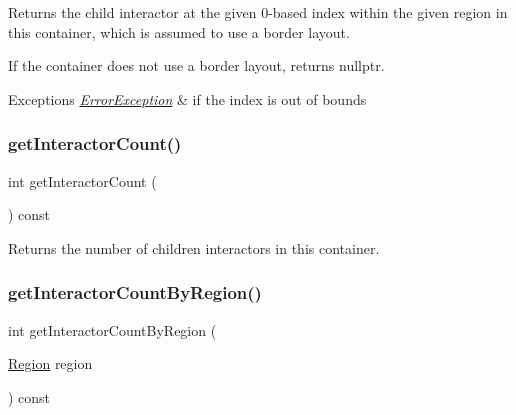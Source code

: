 Returns the child interactor at the given 0-\/based index within the given region in this container, which is assumed to use a border layout. 

If the container does not use a border layout, returns nullptr. 
\begin{DoxyExceptions}{Exceptions}
{\em \mbox{\hyperlink{classErrorException}{Error\+Exception}}} & if the index is out of bounds \\
\hline
\end{DoxyExceptions}
\mbox{\label{classGContainer_a789affbf8e89e65e3afd63cc626f5a81}} 
\subsubsection{\texorpdfstring{get\+Interactor\+Count()}{getInteractorCount()}}
{\footnotesize\ttfamily int get\+Interactor\+Count (\begin{DoxyParamCaption}{ }\end{DoxyParamCaption}) const\hspace{0.3cm}{\ttfamily [virtual]}}



Returns the number of children interactors in this container. 

\mbox{\label{classGContainer_a668fe9a4efc31fa065ded79c0e5eab64}} 
\subsubsection{\texorpdfstring{get\+Interactor\+Count\+By\+Region()}{getInteractorCountByRegion()}\hspace{0.1cm}{\footnotesize\ttfamily [1/2]}}
{\footnotesize\ttfamily int get\+Interactor\+Count\+By\+Region (\begin{DoxyParamCaption}\item[{\mbox{\hyperlink{classGContainer_a81a01a86de31071a92e6cce0bab9bc4b}{Region}}}]{region }\end{DoxyParamCaption}) const\hspace{0.3cm}{\ttfamily [virtual]}}



